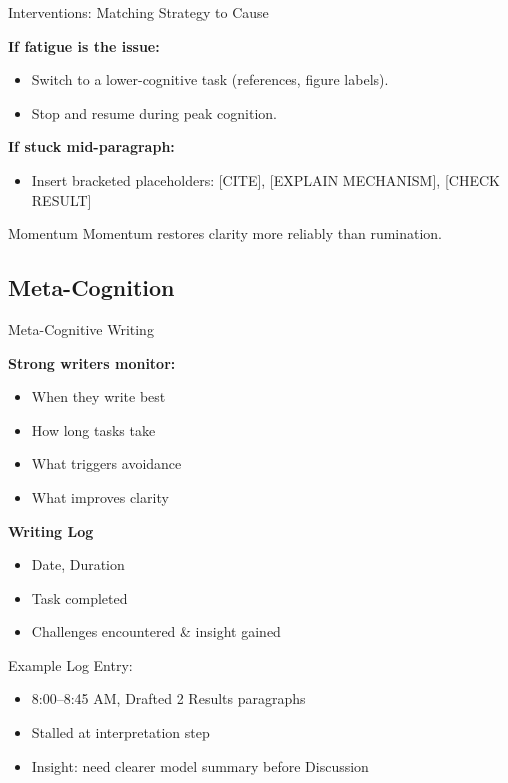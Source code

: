 \documentclass{beamer}
\begin{document}
\begin{frame}{Interventions: Matching Strategy to Cause}


\textbf{If fatigue is the issue:}
\begin{itemize}
    \item Switch to a lower-cognitive task (references, figure labels).
    \item Stop and resume during peak cognition.
\end{itemize}

\textbf{If stuck mid-paragraph:}
\begin{itemize}
    \item Insert bracketed placeholders:
    [CITE], [EXPLAIN MECHANISM], [CHECK RESULT]
\end{itemize}

\vspace{0.5em}
\begin{block}{Momentum}
    Momentum restores clarity more reliably than rumination.
\end{block}


\end{frame}


\subsection{Meta-Cognition}

\begin{frame}{Meta-Cognitive Writing}

\textbf{Strong writers monitor:}
\begin{itemize}
    \item When they write best
    \item How long tasks take
    \item What triggers avoidance
    \item What improves clarity
\end{itemize}

\textbf{Writing Log}
\begin{itemize}
    \item Date, Duration
    \item Task completed
    \item Challenges encountered \& insight gained
\end{itemize}

\vspace{1em}
\scriptsize
Example Log Entry:
\begin{itemize}
    \item 8:00--8:45 AM, Drafted 2 Results paragraphs
    \item Stalled at interpretation step
    \item Insight: need clearer model summary before Discussion
\end{itemize}

\end{frame}
\end{document}
